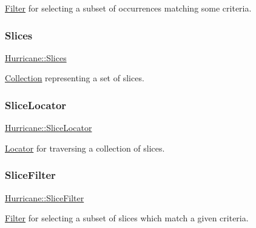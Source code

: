 \mbox{\hyperlink{classHurricane_1_1Filter}{Filter}} for selecting a subset of occurrences matching some criteria. \mbox{\label{namespaceHurricane_aa4a7e8a563c5687621eb5e57ade1706a}} 
\subsubsection{\texorpdfstring{Slices}{Slices}}
{\footnotesize\ttfamily \mbox{\hyperlink{namespaceHurricane_aa4a7e8a563c5687621eb5e57ade1706a}{Hurricane\+::\+Slices}}}

\mbox{\hyperlink{classHurricane_1_1Collection}{Collection}} representing a set of slices. \mbox{\label{namespaceHurricane_a5c3b720aae3437342e9d6c57729dc895}} 
\subsubsection{\texorpdfstring{Slice\+Locator}{SliceLocator}}
{\footnotesize\ttfamily \mbox{\hyperlink{namespaceHurricane_a5c3b720aae3437342e9d6c57729dc895}{Hurricane\+::\+Slice\+Locator}}}

\mbox{\hyperlink{classHurricane_1_1Locator}{Locator}} for traversing a collection of slices. \mbox{\label{namespaceHurricane_a80703f9d02b235f3291fabbf53f86d4e}} 
\subsubsection{\texorpdfstring{Slice\+Filter}{SliceFilter}}
{\footnotesize\ttfamily \mbox{\hyperlink{namespaceHurricane_a80703f9d02b235f3291fabbf53f86d4e}{Hurricane\+::\+Slice\+Filter}}}

\mbox{\hyperlink{classHurricane_1_1Filter}{Filter}} for selecting a subset of slices which match a given criteria. 